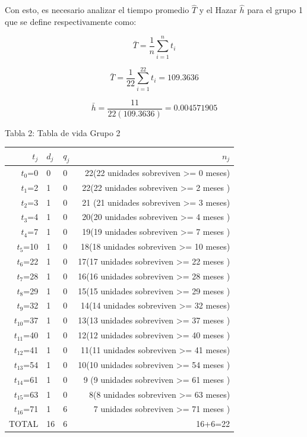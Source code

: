 \documentclass[
  12pt,
  letterpaper,
]{article}
\begin{document}
Con esto, es necesario analizar el tiempo promedio \(\hat{T}\) y el
Hazar \(\hat{h}\) para el grupo 1 que se define respectivamente como:

\[
\bar{T}=\frac{1}{n} \sum_{i=1}^n t_i
\]

\[
\bar{T}=\frac{1}{22} \sum_{i=1}^{22} t_i=109.3636
\]

\[
\bar{h}=\frac{11}{22(109.3636)}=0.004571905
\]

Tabla 2: Tabla de vida Grupo 2

\begin{longtable}[]{@{}rllr@{}}
\toprule()
\(t_j\) & \(d_j\) & \(q_j\) & \(n_j\) \\
\midrule()
\endhead
\(t_0\)=0 & 0 & 0 & 22(22 unidades sobreviven \textgreater= 0 meses) \\
\(t_1\)=2 & 1 & 0 & 22(22 unidades sobreviven \textgreater= 2 meses ) \\
\(t_2\)=3 & 1 & 0 & 21 (21 unidades sobreviven \textgreater= 3 meses) \\
\(t_3\)=4 & 1 & 0 & 20(20 unidades sobreviven \textgreater= 4 meses ) \\
\(t_4\)=7 & 1 & 0 & 19(19 unidades sobreviven \textgreater= 7 meses ) \\
\(t_5\)=10 & 1 & 0 & 18(18 unidades sobreviven \textgreater= 10
meses) \\
\(t_6\)=22 & 1 & 0 & 17(17 unidades sobreviven \textgreater= 22 meses
) \\
\(t_7\)=28 & 1 & 0 & 16(16 unidades sobreviven \textgreater= 28 meses
) \\
\(t_8\)=29 & 1 & 0 & 15(15 unidades sobreviven \textgreater= 29 meses
) \\
\(t_9\)=32 & 1 & 0 & 14(14 unidades sobreviven \textgreater= 32
meses) \\
\(t_10\)=37 & 1 & 0 & 13(13 unidades sobreviven \textgreater= 37 meses
) \\
\(t_11\)=40 & 1 & 0 & 12(12 unidades sobreviven \textgreater= 40 meses
) \\
\(t_12\)=41 & 1 & 0 & 11(11 unidades sobreviven \textgreater= 41
meses) \\
\(t_13\)=54 & 1 & 0 & 10(10 unidades sobreviven \textgreater= 54 meses
) \\
\(t_14\)=61 & 1 & 0 & 9 (9 unidades sobreviven \textgreater= 61 meses
) \\
\(t_15\)=63 & 1 & 0 & 8(8 unidades sobreviven \textgreater= 63 meses) \\
\(t_16\)=71 & 1 & 6 & 7 unidades sobreviven \textgreater= 71 meses ) \\
TOTAL & 16 & 6 & 16+6=22 \\
\bottomrule()
\end{longtable}
\end{document}
